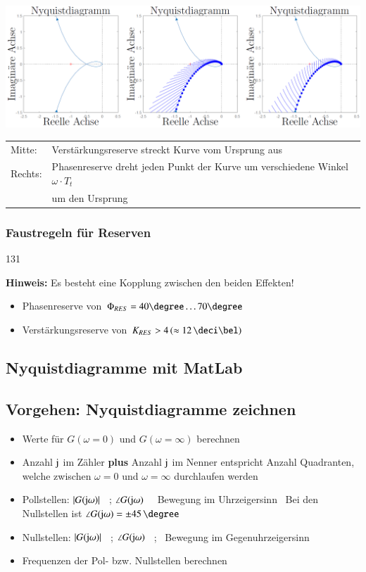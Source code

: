 \includegraphics[width=\columnwidth]{images/nyquist_stabilitaetsreserven.png}

\begin{tabular}{ll}
    Mitte:  & Verstärkungsreserve streckt Kurve vom Ursprung aus \\
    Rechts: & Phasenreserve dreht jeden Punkt der Kurve um verschiedene Winkel $\omega \cdot T_t$ \\
            & um den Ursprung  
\end{tabular}


\subsubsection{Faustregeln für Reserven}{131}

\textbf{Hinweis:} Es besteht eine Kopplung zwischen den beiden Effekten!

\begin{itemize}
    \item Phasenreserve von $\Phi_{RES} = 40 \degree \ldots 70 \degree$
    \item Verstärkungsreserve von $K_{RES} > 4 \, (\approx 12 \, \deci \bel)$
\end{itemize}


\subsection{Nyquistdiagramme mit MatLab}



\subsection{Vorgehen: Nyquistdiagramme zeichnen}

\begin{itemize}
    \item Werte für $G(\omega = 0)$ und $G(\omega = \infty)$ berechnen
    \item Anzahl $\mathrm{j}$ im Zähler \textbf{plus} Anzahl $\mathrm{j}$ im Nenner entspricht Anzahl Quadranten, welche zwischen $\omega = 0$ und 
        $\omega = \infty$ durchlaufen werden
    \item Pollstellen: $|G(\mathrm{j} \omega)|$ \textdownarrow\ ; $\angle G(\mathrm{j} \omega)$ \textdownarrow\ \textrightarrow\ Bewegung im Uhrzeigersinn
        \textrightarrow\ Bei den Nullstellen ist $\angle G(\jimg \omega) = \pm 45 \, \degree$
    \item Nullstellen: $|G(\mathrm{j} \omega)|$ \textuparrow\ ; $\angle G(\mathrm{j} \omega)$ \textuparrow\ ; \textrightarrow\ Bewegung im Gegenuhrzeigersinn
    \item Frequenzen der Pol- bzw. Nullstellen berechnen
\end{itemize}